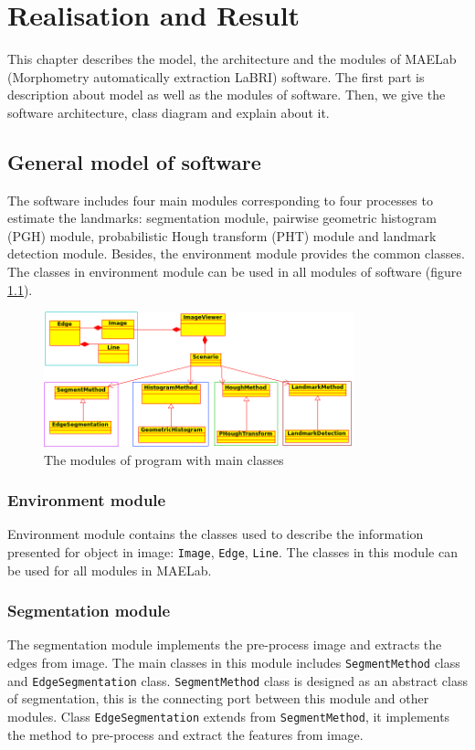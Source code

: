 \chapter{Realisation and Result}
This chapter describes the model, the architecture and the modules of MAELab (Morphometry automatically extraction LaBRI) software. The first part is description about model as well as the modules of software. Then, we give the software architecture, class diagram and explain about it.
\section{General model of software}
The software includes four main modules corresponding to four processes to estimate the landmarks: segmentation module, pairwise geometric histogram (PGH) module, probabilistic Hough transform (PHT) module and landmark detection module. Besides, the environment module provides the common classes. The classes in environment module can be used in all modules of software (figure \ref{fig:41}).
\begin{figure}[h!]
\centering
\includegraphics[width=0.8\textwidth]{./images/modules}
\caption{The modules of program with main classes}
\label{fig:41}
\end{figure}
\subsection*{Environment module}
Environment module contains the classes used to describe the information presented for object in image: \texttt{Image}, \texttt{Edge}, \texttt{Line}. The classes in this module can be used for all modules in MAELab.
\subsection{Segmentation module}
The segmentation module implements the pre-process image and extracts the edges from image. The main classes in this module includes \texttt{SegmentMethod} class and \texttt{EdgeSegmentation} class. \texttt{SegmentMethod} class is designed as an abstract class of segmentation, this is the connecting port between this module and other modules. Class \texttt{EdgeSegmentation} extends from \texttt{SegmentMethod}, it implements the method to pre-process and extract the features from image. 
